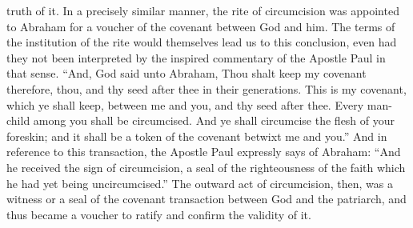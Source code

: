 \documentclass[]{book}
\begin{document}
truth of it. In a precisely similar manner, the rite of circumcision was appointed to Abraham for a voucher of the covenant between God and him. The terms of the institution of the rite would themselves lead us to this conclusion, even had they not been interpreted by the inspired commentary of the Apostle Paul in that sense. ``And, God said unto Abraham, Thou shalt keep my covenant therefore, thou, and thy seed after thee in their generations. This is my covenant, which ye shall keep, between me and you, and thy seed after thee. Every man-child among you shall be circumcised. And ye shall circumcise the flesh of your foreskin; and it shall be a token of the covenant betwixt me and you.'' And in reference to this transaction, the Apostle Paul expressly says of Abraham: ``And he received the sign of circumcision, a seal of the righteousness of the faith which he had yet being uncircumcised.'' The outward act of circumcision, then, was a witness or a seal of the covenant transaction between God and the patriarch, and thus became a voucher to ratify and confirm the validity of it.
\end{document}
